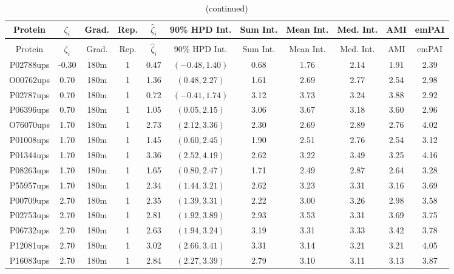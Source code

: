 \begin{landscape}
\begin{longtable}{cccc|cc|ccccc}
\caption{Detailed empirical results for UPS2 experiments, 180m gradients
\label{supp:proteomics:tab:ups2_180m}} \\
 Protein & $\zeta_i$ & Grad. & Rep. & $\hat{\zeta}_i$ & 90\% HPD Int. & Sum Int. & Mean Int. & Med. Int. & AMI & emPAI \\
\hline
\endfirsthead
\caption{(continued)} \\
 Protein & $\zeta_i$ & Grad. & Rep. & $\hat{\zeta}_i$ & 90\% HPD Int. & Sum Int. & Mean Int. & Med. Int. & AMI & emPAI \\
\hline
\endhead
P02788ups & -0.30 & 180m &   1 & 0.47 & $(-0.48, 1.40)$ & 0.68 & 1.76 & 2.14 & 1.91 & 2.39 \\ 
  O00762ups & 0.70 & 180m &   1 & 1.36 & $(0.48, 2.27)$ & 1.61 & 2.69 & 2.77 & 2.54 & 2.98 \\ 
  P02787ups & 0.70 & 180m &   1 & 0.72 & $(-0.41, 1.74)$ & 3.12 & 3.73 & 3.24 & 3.88 & 2.92 \\ 
  P06396ups & 0.70 & 180m &   1 & 1.05 & $(0.05, 2.15)$ & 3.06 & 3.67 & 3.18 & 3.60 & 2.96 \\ 
  O76070ups & 1.70 & 180m &   1 & 2.73 & $(2.12, 3.36)$ & 2.30 & 2.69 & 2.89 & 2.76 & 4.02 \\ 
  P01008ups & 1.70 & 180m &   1 & 1.45 & $(0.60, 2.45)$ & 1.90 & 2.51 & 2.76 & 2.54 & 3.12 \\ 
  P01344ups & 1.70 & 180m &   1 & 3.36 & $(2.52, 4.19)$ & 2.62 & 3.22 & 3.49 & 3.25 & 4.16 \\ 
  P08263ups & 1.70 & 180m &   1 & 1.65 & $(0.80, 2.47)$ & 1.71 & 2.49 & 2.87 & 2.64 & 3.28 \\ 
  P55957ups & 1.70 & 180m &   1 & 2.34 & $(1.44, 3.21)$ & 2.62 & 3.23 & 3.31 & 3.16 & 3.69 \\ 
  P00709ups & 2.70 & 180m &   1 & 2.35 & $(1.39, 3.31)$ & 2.22 & 3.00 & 3.26 & 2.98 & 3.58 \\ 
  P02753ups & 2.70 & 180m &   1 & 2.81 & $(1.92, 3.89)$ & 2.93 & 3.53 & 3.31 & 3.69 & 3.75 \\ 
  P06732ups & 2.70 & 180m &   1 & 2.63 & $(1.94, 3.24)$ & 3.19 & 3.31 & 3.33 & 3.42 & 3.78 \\ 
  P12081ups & 2.70 & 180m &   1 & 3.02 & $(2.66, 3.41)$ & 3.31 & 3.14 & 3.21 & 3.21 & 4.05 \\ 
  P16083ups & 2.70 & 180m &   1 & 2.84 & $(2.27, 3.39)$ & 2.79 & 3.10 & 3.11 & 3.13 & 3.87 \\ 

\end{longtable}
\end{landscape}
